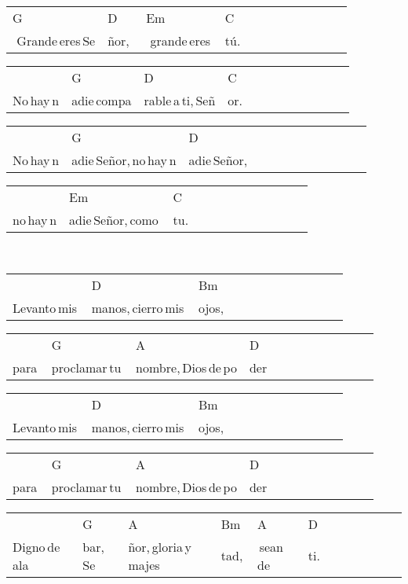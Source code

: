 \begin{multicols}{2}
\begin{minipage}{\columnwidth}
\noindent
\begin{tabular}{llllllllllll}
G&D&Em&C\\
\,\,Grande\,eres\,Se&ñor,\,\quad\,&\,\,grande\,eres\,&tú.
\end{tabular}

\noindent
\begin{tabular}{llllllllllll}
&G&D&C\\
No\,hay\,n&adie\,compa&rable\,a\,ti,\,Señ&or.
\end{tabular}

\noindent
\begin{tabular}{llllllllllll}
&G&D\\
No\,hay\,n&adie\,Señor,\,no\,hay\,n&adie\,Señor,
\end{tabular}

\noindent
\begin{tabular}{llllllllllll}
&Em&C\\
no\,hay\,n&adie\,Señor,\,como\,&tu.
\end{tabular}
\end{minipage}\\

\noindent
\begin{minipage}{\columnwidth}
\noindent
\noindent
\begin{tabular}{llllllllllll}
&D&Bm\\
Levanto\,mis\,&manos,\,cierro\,mis\,&ojos,
\end{tabular}

\noindent
\begin{tabular}{llllllllllll}
&G&A&D\\
para\,&proclamar\,tu\,&nombre,\,Dios\,de\,po&der
\end{tabular}

\noindent
\begin{tabular}{llllllllllll}
&D&Bm\\
Levanto\,mis\,&manos,\,cierro\,mis\,&ojos,
\end{tabular}

\noindent
\begin{tabular}{llllllllllll}
&G&A&D\\
para\,&proclamar\,tu\,&nombre,\,Dios\,de\,po&der
\end{tabular}

\noindent
\begin{tabular}{llllllllllll}
&G&A&Bm&A&D\\
Digno\,de\,ala&bar,\,Se&ñor,\,gloria\,y\,majes&tad,\quad\,&\,sean\,de\,&ti.
\end{tabular}


\end{minipage}
\end{multicols}
